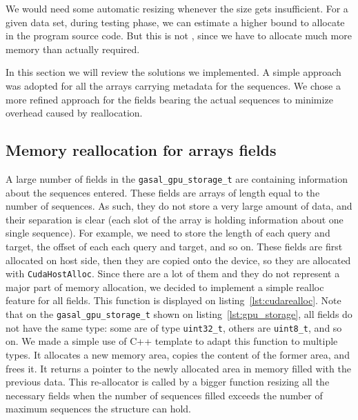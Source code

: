 We would need some automatic resizing whenever the size gets insufficient.
For a given data set, during testing phase, we can estimate a higher bound to allocate in the program source code. But this is not , since we have to allocate much more memory than actually required.

In this section we will review the solutions we implemented. A simple approach was adopted for all the arrays carrying metadata for the sequences. We chose a more refined approach for the fields bearing the actual sequences to minimize overhead caused by reallocation.

\subsection{Memory reallocation for arrays fields}

A large number of fields in the \verb|gasal_gpu_storage_t| are containing information about the sequences entered. These fields are arrays of length equal to the number of sequences. As such, they do not store a very large amount of data, and their separation is clear (each slot of the array is holding information about one single sequence). For example, we need to store the length of each query and target, the offset of each each query and target, and so on. These fields are first allocated on host side, then they are copied onto the device, so they are allocated with \verb|CudaHostAlloc|. Since there are a lot of them and they do not represent a major part of memory allocation, we decided to implement a simple realloc feature for all fields. This function is displayed on listing~\ref{lst:cudarealloc}. Note that on the \verb|gasal_gpu_storage_t| shown on listing~\ref{lst:gpu_storage}, all fields do not have the same type: some are of type \verb|uint32_t|, others are \verb|uint8_t|, and so on. We made a simple use of C++ template to adapt this function to multiple types. It allocates a new memory area, copies the content of the former area, and frees it. It returns a pointer to the newly allocated area in memory filled with the previous data. This re-allocator is called by a bigger function resizing all the necessary fields when the number of sequences filled exceeds the number of maximum sequences the structure can hold.

